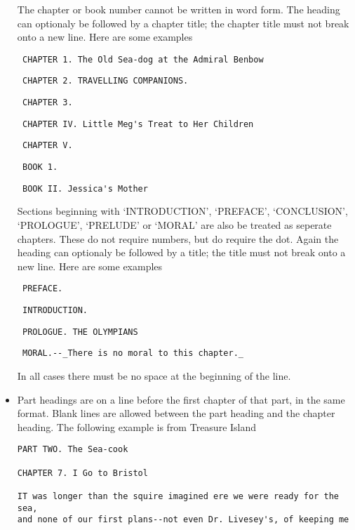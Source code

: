 \documentclass[a4paper,10pt]{paper}
\begin{document}
\begin{itemize}
        The chapter or book number cannot be written in word form.
        The heading can optionaly be followed by a chapter title; the chapter title must not break onto a new line.
        Here are some examples
        \begin{verbatim} CHAPTER 1. The Old Sea-dog at the Admiral Benbow\end{verbatim}
        \begin{verbatim} CHAPTER 2. TRAVELLING COMPANIONS.\end{verbatim}
        \begin{verbatim} CHAPTER 3.\end{verbatim}
        \begin{verbatim} CHAPTER IV. Little Meg's Treat to Her Children\end{verbatim}
        \begin{verbatim} CHAPTER V.\end{verbatim}
        \begin{verbatim} BOOK 1.\end{verbatim}
        \begin{verbatim} BOOK II. Jessica's Mother\end{verbatim}
        Sections beginning with `INTRODUCTION', `PREFACE', `CONCLUSION', `PROLOGUE', `PRELUDE' or `MORAL' are also be treated as seperate chapters.
        These do not require numbers, but do require the dot.
        Again the heading can optionaly be followed by a title; the title must not break onto a new line.
        Here are some examples
        \begin{verbatim} PREFACE.\end{verbatim}
        \begin{verbatim} INTRODUCTION.\end{verbatim}
        \begin{verbatim} PROLOGUE. THE OLYMPIANS\end{verbatim}
        \begin{verbatim} MORAL.--_There is no moral to this chapter._\end{verbatim}
        In all cases there must be no space at the beginning of the line.
    \item Part headings are on a line before the first chapter of that part, in the same format. Blank lines are allowed between the part heading and the chapter heading.
          The following example is from Treasure Island
      \begin{verbatim}PART TWO. The Sea-cook

CHAPTER 7. I Go to Bristol

IT was longer than the squire imagined ere we were ready for the sea,
and none of our first plans--not even Dr. Livesey's, of keeping me\end{verbatim}
\end{itemize}
\end{document}
